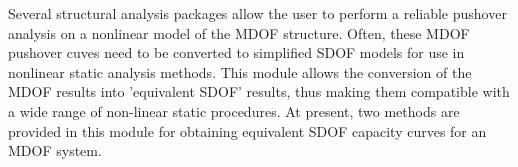 Several structural analysis packages allow the user to perform a reliable pushover analysis on a nonlinear model of the MDOF structure. Often, these MDOF pushover cuves need to be converted to simplified SDOF models for use in nonlinear static analysis methods. This module allows the conversion of the MDOF results into 'equivalent SDOF' results, thus making them compatible with a wide range of non-linear static procedures. At present, two methods are provided in this module for obtaining equivalent SDOF capacity curves for an MDOF system.